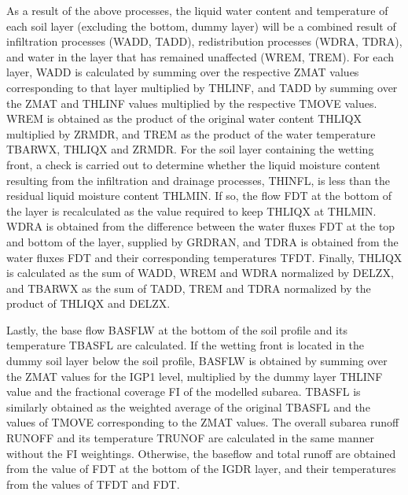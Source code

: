 As a result of the above processes, the liquid water content and temperature of each soil layer (excluding the bottom, dummy layer) will be a combined result of infiltration processes (W\+A\+D\+D, T\+A\+D\+D), redistribution processes (W\+D\+R\+A, T\+D\+R\+A), and water in the layer that has remained unaffected (W\+R\+E\+M, T\+R\+E\+M). For each layer, W\+A\+D\+D is calculated by summing over the respective Z\+M\+A\+T values corresponding to that layer multiplied by T\+H\+L\+I\+N\+F, and T\+A\+D\+D by summing over the Z\+M\+A\+T and T\+H\+L\+I\+N\+F values multiplied by the respective T\+M\+O\+V\+E values. W\+R\+E\+M is obtained as the product of the original water content T\+H\+L\+I\+Q\+X multiplied by Z\+R\+M\+D\+R, and T\+R\+E\+M as the product of the water temperature T\+B\+A\+R\+W\+X, T\+H\+L\+I\+Q\+X and Z\+R\+M\+D\+R. For the soil layer containing the wetting front, a check is carried out to determine whether the liquid moisture content resulting from the infiltration and drainage processes, T\+H\+I\+N\+F\+L, is less than the residual liquid moisture content T\+H\+L\+M\+I\+N. If so, the flow F\+D\+T at the bottom of the layer is recalculated as the value required to keep T\+H\+L\+I\+Q\+X at T\+H\+L\+M\+I\+N. W\+D\+R\+A is obtained from the difference between the water fluxes F\+D\+T at the top and bottom of the layer, supplied by G\+R\+D\+R\+A\+N, and T\+D\+R\+A is obtained from the water fluxes F\+D\+T and their corresponding temperatures T\+F\+D\+T. Finally, T\+H\+L\+I\+Q\+X is calculated as the sum of W\+A\+D\+D, W\+R\+E\+M and W\+D\+R\+A normalized by D\+E\+L\+Z\+X, and T\+B\+A\+R\+W\+X as the sum of T\+A\+D\+D, T\+R\+E\+M and T\+D\+R\+A normalized by the product of T\+H\+L\+I\+Q\+X and D\+E\+L\+Z\+X.

Lastly, the base flow B\+A\+S\+F\+L\+W at the bottom of the soil profile and its temperature T\+B\+A\+S\+F\+L are calculated. If the wetting front is located in the dummy soil layer below the soil profile, B\+A\+S\+F\+L\+W is obtained by summing over the Z\+M\+A\+T values for the I\+G\+P1 level, multiplied by the dummy layer T\+H\+L\+I\+N\+F value and the fractional coverage F\+I of the modelled subarea. T\+B\+A\+S\+F\+L is similarly obtained as the weighted average of the original T\+B\+A\+S\+F\+L and the values of T\+M\+O\+V\+E corresponding to the Z\+M\+A\+T values. The overall subarea runoff R\+U\+N\+O\+F\+F and its temperature T\+R\+U\+N\+O\+F are calculated in the same manner without the F\+I weightings. Otherwise, the baseflow and total runoff are obtained from the value of F\+D\+T at the bottom of the I\+G\+D\+R layer, and their temperatures from the values of T\+F\+D\+T and F\+D\+T.

